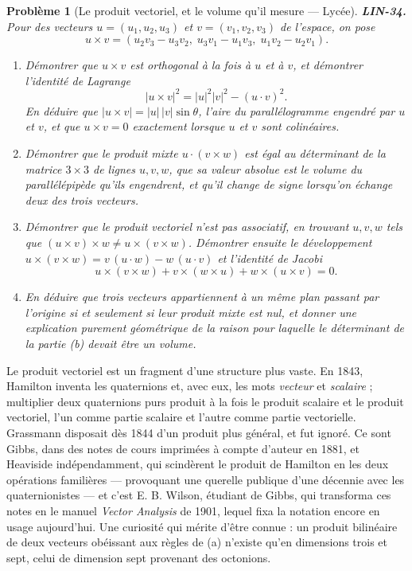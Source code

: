 \documentclass[11pt]{article}
\newtheorem{problem}{Problème}
\begin{document}
\bigskip

\begin{problem}[{Le produit vectoriel, et le volume qu'il mesure --- Lycée}]
\textbf{LIN-34.} Pour des vecteurs $u = (u_1, u_2, u_3)$ et $v = (v_1, v_2, v_3)$ de l'espace, on pose
\[ u \times v = (u_2 v_3 - u_3 v_2,\; u_3 v_1 - u_1 v_3,\; u_1 v_2 - u_2 v_1). \]
\begin{enumerate}
\item[(a)] Démontrer que $u \times v$ est orthogonal à la fois à $u$ et à $v$, et démontrer l'identité
de Lagrange
\[ |u \times v|^2 = |u|^2 |v|^2 - (u \cdot v)^2 . \]
En déduire que $|u \times v| = |u|\,|v| \sin\theta$, l'aire du parallélogramme engendré par $u$
et $v$, et que $u \times v = 0$ exactement lorsque $u$ et $v$ sont colinéaires.
\item[(b)] Démontrer que le produit mixte $u \cdot (v \times w)$ est égal au déterminant de la matrice
$3 \times 3$ de lignes $u, v, w$, que sa valeur absolue est le volume du parallélépipède qu'ils
engendrent, et qu'il change de signe lorsqu'on échange deux des trois vecteurs.
\item[(c)] Démontrer que le produit vectoriel n'est pas associatif, en trouvant $u, v, w$ tels que
$(u \times v) \times w \ne u \times (v \times w)$. Démontrer ensuite le développement
$u \times (v \times w) = v\,(u \cdot w) - w\,(u \cdot v)$ et l'identité de Jacobi
\[ u \times (v \times w) + v \times (w \times u) + w \times (u \times v) = 0 . \]
\item[(d)] En déduire que trois vecteurs appartiennent à un même plan passant par l'origine si et seulement
si leur produit mixte est nul, et donner une explication purement géométrique de la raison pour
laquelle le déterminant de la partie (b) devait être un volume.
\end{enumerate}

\end{problem}

\noindent Le produit vectoriel est un fragment d'une structure plus vaste. En 1843, Hamilton
inventa les quaternions et, avec eux, les mots \textit{vecteur} et \textit{scalaire} ; multiplier deux
quaternions \og{} purs \fg{} produit à la fois le produit scalaire et le produit vectoriel, l'un comme partie
scalaire et l'autre comme partie vectorielle. Grassmann disposait dès 1844 d'un produit plus général,
et fut ignoré. Ce sont Gibbs, dans des notes de cours imprimées à compte d'auteur en 1881, et
Heaviside indépendamment, qui scindèrent le produit de Hamilton en les deux opérations familières ---
provoquant une querelle publique d'une décennie avec les quaternionistes --- et c'est E. B. Wilson,
étudiant de Gibbs, qui transforma ces notes en le manuel \textit{Vector Analysis} de 1901, lequel fixa
la notation encore en usage aujourd'hui. Une curiosité qui mérite d'être connue : un produit
bilinéaire de deux vecteurs obéissant aux règles de (a) n'existe qu'en dimensions trois et sept,
celui de dimension sept provenant des octonions.
\end{document}
